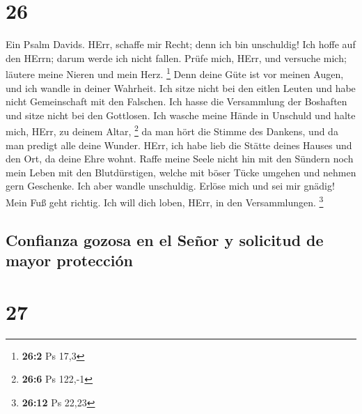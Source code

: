 \hypertarget{section-25}{%
\section{26}\label{section-25}}

 Ein Psalm Davids. HErr, schaffe mir Recht; denn ich bin
unschuldig! Ich hoffe auf den HErrn; darum werde ich nicht fallen.
 Prüfe mich, HErr, und versuche mich; läutere meine Nieren
und mein Herz. \footnote{\textbf{26:2} Ps 17,3}  Denn
deine Güte ist vor meinen Augen, und ich wandle in deiner Wahrheit.
 Ich sitze nicht bei den eitlen Leuten und habe nicht
Gemeinschaft mit den Falschen.  Ich hasse die Versammlung
der Boshaften und sitze nicht bei den Gottlosen.  Ich
wasche meine Hände in Unschuld und halte mich, HErr, zu deinem Altar,
\footnote{\textbf{26:6} Ps 122,-1}  da man hört die Stimme
des Dankens, und da man predigt alle deine Wunder.  HErr,
ich habe lieb die Stätte deines Hauses und den Ort, da deine Ehre wohnt.
 Raffe meine Seele nicht hin mit den Sündern noch mein
Leben mit den Blutdürstigen,  welche mit böser Tücke
umgehen und nehmen gern Geschenke.  Ich aber wandle
unschuldig. Erlöse mich und sei mir gnädig!  Mein Fuß
geht richtig. Ich will dich loben, HErr, in den Versammlungen.
\footnote{\textbf{26:12} Ps 22,23}

\hypertarget{confianza-gozosa-en-el-seuxf1or-y-solicitud-de-mayor-protecciuxf3n}{%
\subsection{Confianza gozosa en el Señor y solicitud de mayor
protección}\label{confianza-gozosa-en-el-seuxf1or-y-solicitud-de-mayor-protecciuxf3n}}

\hypertarget{section-26}{%
\section{27}\label{section-26}}

